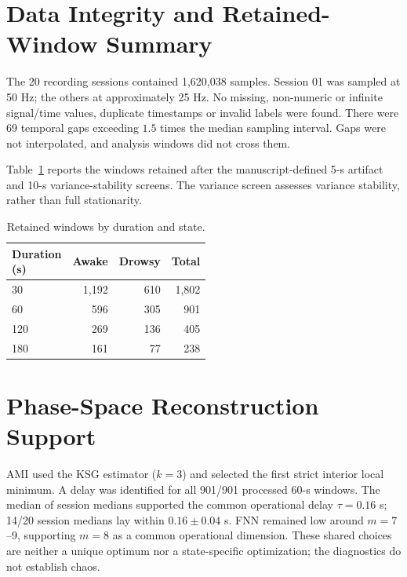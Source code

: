 \documentclass[conference,a4paper]{IEEEtran}
\begin{document}

\section{Data Integrity and Retained-Window Summary}\label{sec:supp_1}
The 20 recording sessions contained 1,620,038 samples. Session 01 was sampled at 50 Hz; the others at approximately 25 Hz. No missing, non-numeric or infinite signal/time values, duplicate timestamps or invalid labels were found. There were 69 temporal gaps exceeding $1.5$ times the median sampling interval. Gaps were not interpolated, and analysis windows did not cross them.

Table~\ref{tab:supp_retained} reports the windows retained after the manuscript-defined 5-s artifact and 10-s variance-stability screens. The variance screen assesses variance stability, rather than full stationarity.

\begin{table}[t]
\centering
\caption{Retained windows by duration and state.}\label{tab:supp_retained}
\footnotesize
\setlength{\tabcolsep}{3pt}
\renewcommand{\arraystretch}{1.05}
\begin{tabular*}{\linewidth}{@{\extracolsep{\fill}}lrrr@{}}
\toprule
\makecell{Duration\\(s)} & Awake & Drowsy & Total\\
\midrule
30 & 1,192 & 610 & 1,802\\
60 & 596 & 305 & 901\\
120 & 269 & 136 & 405\\
180 & 161 & 77 & 238\\
\bottomrule
\end{tabular*}
\end{table}
\section{Phase-Space Reconstruction Support}\label{sec:supp_2}
AMI used the KSG estimator ($k=3$) and selected the first strict interior local minimum. A delay was identified for all 901/901 processed 60-s windows. The median of session medians supported the common operational delay $\tau=0.16$ s; 14/20 session medians lay within $0.16\pm0.04$ s. FNN remained low around $m=7$--9, supporting $m=8$ as a common operational dimension. These shared choices are neither a unique optimum nor a state-specific optimization; the diagnostics do not establish chaos.
\end{document}
